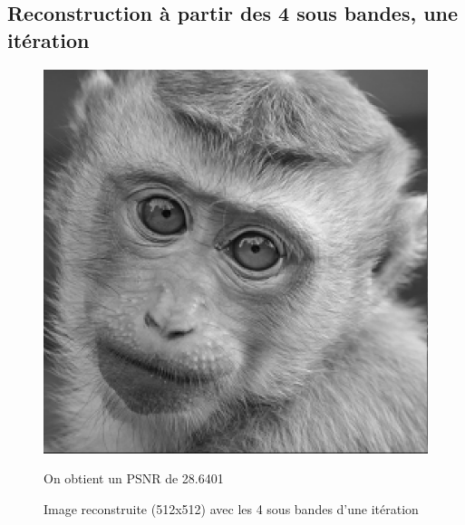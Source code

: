 \documentclass{article}
\begin{document}
\newpage
\subsection{Reconstruction à partir des 4 sous bandes, une itération}
\begin{figure}[h!]
\centerline{ \includegraphics[scale=0.5]{./rendus/Reconstruite1.png} }
\caption{Image reconstruite (512x512) avec les 4 sous bandes d'une itération} 
On obtient un PSNR de 28.6401
\end{figure}



\newpage
\end{document}
